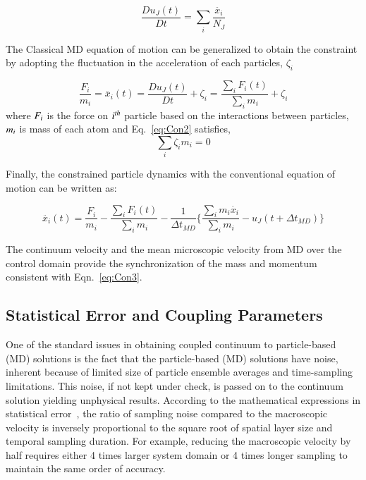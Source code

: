 \documentclass[preprint,12pt]{elsarticle}
\begin{document}
\vspace{-.2em}
\begin{equation}
 \frac{Du_{J}(t)}{Dt} =  \displaystyle\sum_{i} \frac{\ddot{x_{i}}}{N_{J}}
 \label{eq:Lagrangian}
\end{equation}
\normalsize

The Classical MD equation of motion can be generalized to obtain the constraint by adopting the fluctuation in the acceleration of each particles, $\zeta_{i}$

\vspace{-.2em}
\begin{equation}
 \frac{F_{i}}{m_{i}} = \ddot{x_{i}}(t)  =   \frac{Du_{J}(t)}{Dt} + \zeta_{i} = \frac{\displaystyle\sum_{i}F_{i}(t)} {\displaystyle\sum_{i}m_{i}} +   \zeta_{i}
 \label{eq:Con2}
\end{equation}
\normalsize
where $\it F_{i}$ is the force on $\it i^{th}$ particle based on the interactions between particles,  $\it m_{i}$ is mass of each atom and  Eq.~\ref{eq:Con2} satisfies,
\vspace{-.2em}
\begin{equation}
\displaystyle\sum_{i}\zeta_{i}m_{i} = 0
 \label{eq:Con2}
\end{equation}
\normalsize

Finally, the constrained particle dynamics with the conventional equation of motion can be written as:

\vspace{-.2em}
\begin{equation}
 \ddot{x_{i}}(t) = \frac{F_{i}}{m_{i}} -  \frac{\displaystyle\sum_{i}F_{i}(t)} {\displaystyle\sum_{i}m_{i}} - \frac{1}{\Delta t_{MD}} \{  \frac{\displaystyle\sum_{i}m_{i}\dot{x_{i}}} {\displaystyle\sum_{i}m_{i}} - u_{J}(t + \Delta t_{MD})\}
 \label{eq:Con3}
\end{equation}
\normalsize

The continuum velocity and the mean microscopic velocity from MD over the control domain provide the synchronization of the mass and momentum consistent with Eqn.~\ref{eq:Con3}.


\subsection{Statistical Error and Coupling Parameters}
\label{sec:numerical_noise}

One of the standard issues in obtaining coupled continuum to particle-based (MD) solutions is the fact that the particle-based (MD) solutions have noise, inherent because of limited size of particle ensemble averages and time-sampling limitations. This noise, if not kept under check, is passed on to the continuum solution yielding unphysical results. According to the mathematical expressions in statistical error~\cite{Hadjicon3,Time_Mechanism}, the ratio of sampling noise compared to the macroscopic velocity is inversely proportional to the square root of spatial layer size and temporal sampling duration. For example, reducing the macroscopic velocity by half requires either 4 times larger system domain or 4 times longer sampling to maintain the same order of accuracy. 
\end{document}
